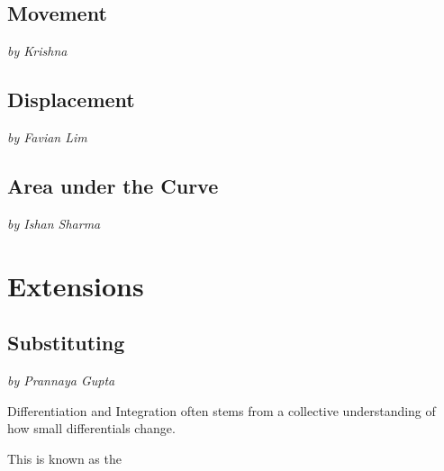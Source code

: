 \documentclass[a4paper,12pt,oneside]{book}
\begin{document}
\chapter{Movement}
\vspace{-30pt}
\large \textit{by Krishna}


\newpage
\chapter{Displacement}
\vspace{-30pt}
\large \textit{by Favian Lim}


\newpage
\chapter{Area under the Curve}
\vspace{-30pt}
\large \textit{by Ishan Sharma}


\part{Extensions}

\newpage
\chapter{Substituting}
\vspace{-30pt}
\large \textit{by Prannaya Gupta}

Differentiation and Integration often stems from a collective understanding of how small differentials change.

This is known as the 
\end{document}
